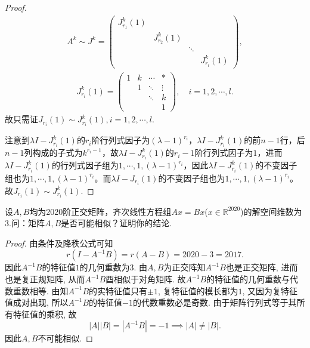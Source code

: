 \documentclass[../../main.tex]{subfiles}%
\begin{document}
\begin{proof}
\begin{align*}
A^k\sim J^k=\begin{pmatrix}
J_{r_1}^k(1) & & & \\
& J_{r_2}^k(1) & & \\
& & \ddots & \\
& & & J_{r_l}^k(1)
\end{pmatrix},
\end{align*}
\begin{align*}
J_{r_i}^k(1)=\begin{pmatrix}
1 & k & \cdots & * \\
& 1 & \ddots & \vdots \\
& & \ddots & k \\
& & & 1
\end{pmatrix},\quad i=1,2,\cdots,l.
\end{align*}
故只需证$J_{r_i}(1)\sim J_{r_i}^k(1),i=1,2,\cdots,l.$

注意到$\lambda I-J_{r_i}^k(1)$的$r_i$阶行列式因子为$(\lambda-1)^{r_i}$，$\lambda I-J_{r_i}^k(1)$的前$n-1$行，后$n-1$列构成的子式为$k^{r_i-1}$，故$\lambda I-J_{r_i}^k(1)$的$r_i-1$阶行列式因子为$1$，进而$\lambda I-J_{r_i}^k(1)$的行列式因子组为$1,\cdots,1,(\lambda-1)^{r_i}$，因此$\lambda I-J_{r_i}^k(1)$的不变因子组也为$1,\cdots,1,(\lambda-1)^{r_i}$。而$\lambda I-J_{r_i}(1)$的不变因子组也为$1,\cdots,1,(\lambda-1)^{r_i}$。故$J_{r_i}(1)\sim J_{r_i}^k(1)$.

\end{proof}

\begin{example}
设$A,B$均为2020阶正交矩阵，齐次线性方程组$Ax=Bx$($x \in \mathbb{R}^{2020}$)的解空间维数为3.问：矩阵$A,B$是否可能相似？证明你的结论.
\end{example}
\begin{proof}

由条件及降秩公式可知
$$r(I - A^{-1}B) = r(A - B) = 2020 - 3 = 2017.$$
因此$A^{-1}B$的特征值$1$的几何重数为$3$. 由$A,B$为正交阵知$A^{-1}B$也是正交矩阵, 进而也是复正规矩阵, 从而$A^{-1}B$酉相似于对角矩阵. 故$A^{-1}B$的特征值的几何重数与代数重数相等.
由知$A^{-1}B$的实特征值只有$\pm 1$, 复特征值的模长都为$1$, 又因为复特征值成对出现, 所以$A^{-1}B$的特征值$-1$的代数重数必是奇数.
由于矩阵行列式等于其所有特征值的乘积, 故
$$|A||B| = |A^{-1}B| = -1 \implies |A| \neq |B|.$$
因此$A,B$不可能相似.

\end{proof}
\end{document}

